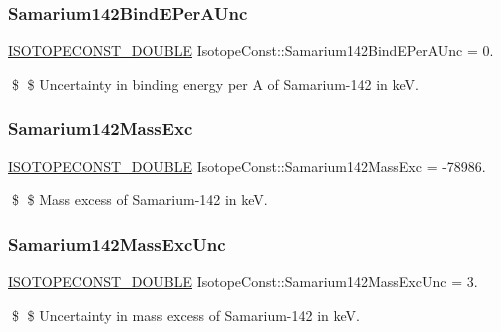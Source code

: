 \subsubsection{\texorpdfstring{Samarium142\+Bind\+E\+Per\+A\+Unc}{Samarium142BindEPerAUnc}}
{\footnotesize\ttfamily \mbox{\hyperlink{group___isotope_const-_macros_ga8f45a7272ce02c0b4c65c44636ed719a}{I\+S\+O\+T\+O\+P\+E\+C\+O\+N\+S\+T\+\_\+\+D\+O\+U\+B\+LE}} Isotope\+Const\+::\+Samarium142\+Bind\+E\+Per\+A\+Unc = 0.}

\$ \$ Uncertainty in binding energy per A of Samarium-\/142 in keV. \mbox{\label{group___isotope_const-_samarium-_sm142_ga207cb922df6c6ddd03f8671082100def}} 
\subsubsection{\texorpdfstring{Samarium142\+Mass\+Exc}{Samarium142MassExc}}
{\footnotesize\ttfamily \mbox{\hyperlink{group___isotope_const-_macros_ga8f45a7272ce02c0b4c65c44636ed719a}{I\+S\+O\+T\+O\+P\+E\+C\+O\+N\+S\+T\+\_\+\+D\+O\+U\+B\+LE}} Isotope\+Const\+::\+Samarium142\+Mass\+Exc = -\/78986.}

\$ \$ Mass excess of Samarium-\/142 in keV. \mbox{\label{group___isotope_const-_samarium-_sm142_gad6dfdca9fa38ca833ca8516e97925a64}} 
\subsubsection{\texorpdfstring{Samarium142\+Mass\+Exc\+Unc}{Samarium142MassExcUnc}}
{\footnotesize\ttfamily \mbox{\hyperlink{group___isotope_const-_macros_ga8f45a7272ce02c0b4c65c44636ed719a}{I\+S\+O\+T\+O\+P\+E\+C\+O\+N\+S\+T\+\_\+\+D\+O\+U\+B\+LE}} Isotope\+Const\+::\+Samarium142\+Mass\+Exc\+Unc = 3.}

\$ \$ Uncertainty in mass excess of Samarium-\/142 in keV. \mbox{\label{group___isotope_const-_samarium-_sm142_ga6c1a85868231613db36ff5c643c97d55}} 

